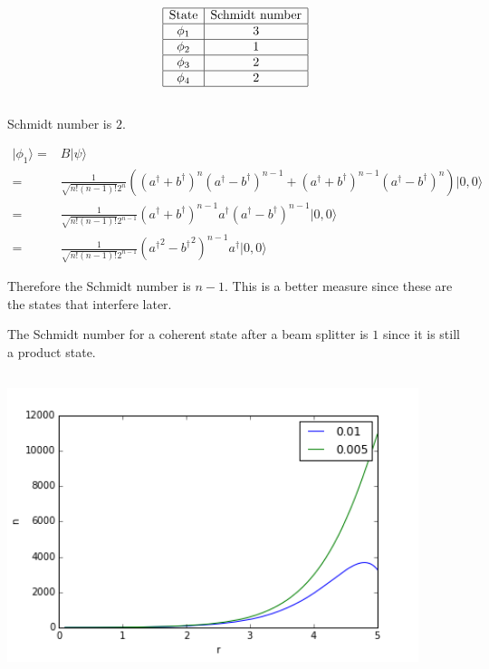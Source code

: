 \documentclass[10pt,fleqn]{article}
\newcommand{\eqar}[1]
{
  \begin{align*}
    #1
  \end{align*}
}
\newcommand{\paren}[1]{{\left({#1}\right)}}
\begin{document}
\subsection{}
\eqar{
  \begin{array}{|c|c|}
    \hline
    \text{State}&\text{Schmidt number}\\\hline
    \phi_1&3\\\hline
    \phi_2&1\\\hline
    \phi_3&2\\\hline
    \phi_4&2\\\hline
  \end{array}
}
\subsection{}
Schmidt number is $2$.
\eqar{
  |\phi_1\rangle=&B|\psi\rangle\\
  =&\frac{1}{\sqrt{n!(n-1)!}2^n}\paren{\paren{a^\dagger+b^\dagger}^{n}\paren{a^\dagger-b^\dagger}^{n-1}+\paren{a^\dagger+b^\dagger}^{n-1}\paren{a^\dagger-b^\dagger}^{n}}|0,0\rangle\\
  =&\frac{1}{\sqrt{n!(n-1)!}2^{n-1}}\paren{a^\dagger+b^\dagger}^{n-1}a^\dagger\paren{a^\dagger-b^\dagger}^{n-1}|0,0\rangle\\
  =&\frac{1}{\sqrt{n!(n-1)!}2^{n-1}}\paren{{a^\dagger}^2-{b^\dagger}^2}^{n-1}a^\dagger|0,0\rangle
}
Therefore the Schmidt number is $n-1$. This is a better measure since these are the states that interfere later.

The Schmidt number for a coherent state after a beam splitter is $1$ since it is still a product state.

\subsection{}
\includegraphics[width=12cm]{4.png}
\end{document}
